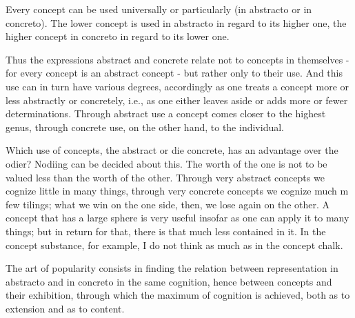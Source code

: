 Every concept can be used universally or particularly
(in abstracto or in concreto).
The lower concept is used in abstracto in regard to its higher one,
the higher concept in concreto in regard to its lower one.

    Thus the expressions abstract and concrete relate not to concepts in
    themselves - for every concept is an abstract concept - but rather only to
    their use. And this use can in turn have various degrees, accordingly as
    one treats a concept more or less abstractly or concretely, i.e., as one
    either leaves aside or adds more or fewer determinations.
    Through abstract use a concept comes closer to the highest genus,
    through concrete use, on the other hand, to the individual.

    Which use of concepts, the abstract or die concrete, has an advantage
    over the odier? Nodiing can be decided about this. The worth of the one
    is not to be valued less than the worth of the other. Through very abstract
    concepts we cognize little in many things, through very concrete concepts
    we cognize much m few tilings; what we win on the one side, then, we lose
    again on the other. A concept that has a large sphere is very useful insofar
    as one can apply it to many things; but in return for that, there is that
    much less contained in it. In the concept substance, for example, I do not
    think as much as in the concept chalk.

The art of popularity consists in finding the relation between
representation in abstracto and in concreto in the same cognition,
hence between concepts and their exhibition,
through which the maximum of cognition is achieved,
both as to extension and as to content.
